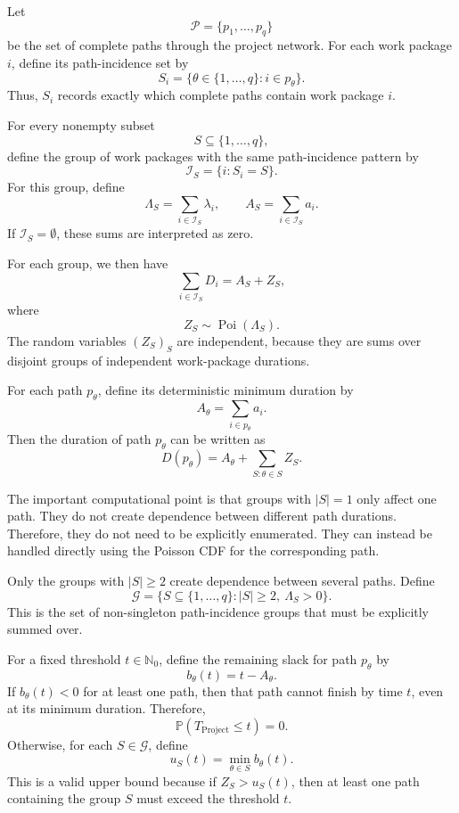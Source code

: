 \documentclass[11pt,a4paper]{article}
\newcommand{\pP}{\mathbb{P}}
\newcommand{\1}{\mathbf{1}}
\theoremstyle{definition}
\theoremstyle{plain}
\theoremstyle{remark}
\numberwithin{equation}{section}
\begin{document}
Let
\[
\mathcal{P}=\{p_1,\ldots,p_q\}
\]
be the set of complete paths through the project network. For each work package $i$, define its path-incidence set by
\[
S_i=\{\theta\in\{1,\ldots,q\}:i\in p_\theta\}.
\]
Thus, $S_i$ records exactly which complete paths contain work package $i$.

For every nonempty subset
\[
S\subseteq\{1,\ldots,q\},
\]
define the group of work packages with the same path-incidence pattern by
\[
\mathcal{I}_S=\{i:S_i=S\}.
\]
For this group, define
\[
\Lambda_S=\sum_{i\in\mathcal{I}_S}\lambda_i,
\qquad
A_S=\sum_{i\in\mathcal{I}_S}a_i.
\]
If $\mathcal{I}_S=\emptyset$, these sums are interpreted as zero.

For each group, we then have
\[
\sum_{i\in\mathcal{I}_S}D_i
=
A_S+Z_S,
\]
where
\[
Z_S\sim\operatorname{Poi}(\Lambda_S).
\]
The random variables $(Z_S)_S$ are independent, because they are sums over disjoint groups of independent work-package durations.

For each path $p_\theta$, define its deterministic minimum duration by
\[
A_\theta=\sum_{i\in p_\theta}a_i.
\]
Then the duration of path $p_\theta$ can be written as
\[
D(p_\theta)
=
A_\theta+\sum_{S:\theta\in S}Z_S.
\]

The important computational point is that groups with $|S|=1$ only affect one path. They do not create dependence between different path durations. Therefore, they do not need to be explicitly enumerated. They can instead be handled directly using the Poisson CDF for the corresponding path.

Only the groups with $|S|\geq 2$ create dependence between several paths. Define
\[
\mathcal{G}
=
\{S\subseteq\{1,\ldots,q\}: |S|\geq 2,\ \Lambda_S>0\}.
\]
This is the set of non-singleton path-incidence groups that must be explicitly summed over.

For a fixed threshold $t\in\mathbb{N}_0$, define the remaining slack for path $p_\theta$ by
\[
b_\theta(t)=t-A_\theta.
\]
If $b_\theta(t)<0$ for at least one path, then that path cannot finish by time $t$, even at its minimum duration. Therefore,
\[
\pP(T_{\text{Project}}\leq t)=0.
\]
Otherwise, for each $S\in\mathcal{G}$, define
\[
u_S(t)=\min_{\theta\in S} b_\theta(t).
\]
This is a valid upper bound because if $Z_S>u_S(t)$, then at least one path containing the group $S$ must exceed the threshold $t$.
\end{document}
